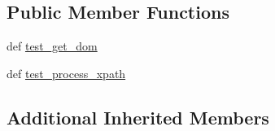 \subsection*{Public Member Functions}
\begin{DoxyCompactItemize}
\item 
def \hyperlink{classcheshire3_1_1test_1_1test_record_1_1_minidom_record_test_case_a5ecb9880d8b323ad353119d3a6748bc5}{test\-\_\-get\-\_\-dom}
\item 
def \hyperlink{classcheshire3_1_1test_1_1test_record_1_1_minidom_record_test_case_a0555082e9a5b833f98c945c05b8c78dd}{test\-\_\-process\-\_\-xpath}
\end{DoxyCompactItemize}
\subsection*{Additional Inherited Members}


